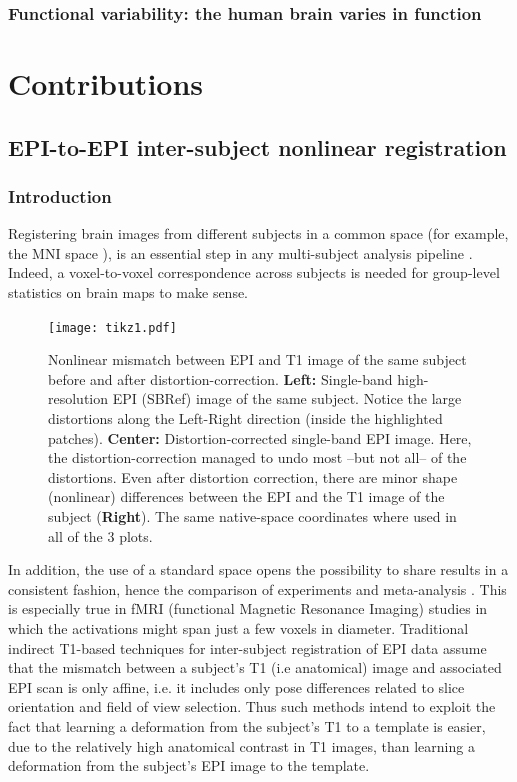 \section{Functional variability: the human brain varies in function}

\part{Contributions}
\chapter{EPI-to-EPI inter-subject nonlinear registration}\label{Chapter_1_Section_1}
\section{Introduction}
Registering brain images from different subjects in a common space
(for example, the MNI space \cite{pmid8126267,pmid9343592}), is an
essential step in any multi-subject analysis pipeline \cite{FristonBook}. Indeed, a
voxel-to-voxel correspondence across subjects is needed for
group-level statistics on brain maps to make sense.
\begin{figure}[!htbp]
     \texttt{[image: tikz1.pdf]}
\caption{Nonlinear mismatch between EPI and T1 image of
  the same subject before and after distortion-correction.
\textbf{Left:} Single-band high-resolution EPI (SBRef) image of the
same subject. Notice the large distortions along the Left-Right direction
(inside the highlighted patches). \textbf{Center:} Distortion-corrected
single-band EPI image. Here, the distortion-correction managed to undo
most --but not all-- of the distortions. Even after distortion
correction, there are minor shape (nonlinear) differences between the
EPI and the T1 image of the subject (\textbf{Right}). The same native-space
coordinates where used in all of the 3 plots.}
\label{fig:pb_fig}
\end{figure}
In addition, the use of a standard space opens the possibility to share
results in a consistent fashion, hence the comparison of experiments
and meta-analysis \cite{pmid18985131,pmid25914639}.
This is especially true in fMRI (functional Magnetic Resonance Imaging)
studies in which the activations might span just a few voxels in diameter.
Traditional indirect T1-based techniques for inter-subject
registration of EPI data assume that the mismatch between a subject's
T1 (i.e anatomical) image and associated EPI scan is only affine,
i.e. it includes only pose differences related to slice orientation
and field of view selection. Thus such methods intend to exploit the
fact that learning a deformation from the subject's T1 to a template
is easier, due to the relatively high anatomical contrast in T1
images, than learning a deformation from the subject's EPI image to the
template.

